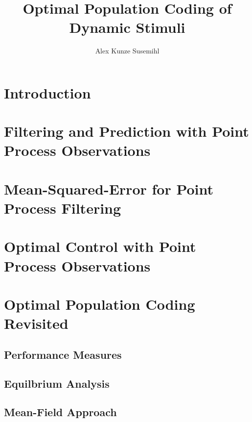 \documentclass[justified]{tufte-book}
\title{Optimal Population Coding of Dynamic Stimuli}
\author{Alex Kunze Susemihl}
\begin{document}
\maketitle
\setcounter{secnumdepth}{1}
\tableofcontents
\chapter{Introduction}



\chapter{Filtering and Prediction with Point Process Observations}

\label{chap:filtering}



\chapter{Mean-Squared-Error for Point Process Filtering}

\label{chap:MSE}



\chapter{Optimal Control with Point Process Observations}

\label{chap:control}



\chapter{Optimal Population Coding Revisited}

\label{chap:optimal}

\section{Performance Measures}

\section{Equilbrium Analysis}

\section{Mean-Field Approach}
\end{document}
